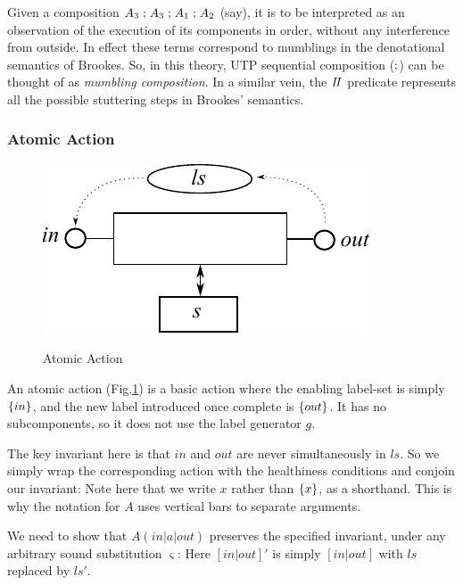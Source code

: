 Given a composition $A_3\mathrel{;} A_3\mathrel{;} A_1 \mathrel{;} A_2$ (say),
it is to be interpreted as an observation
of the execution of its components in order,
without any interference from outside.
In effect these terms correspond to mumblings in the denotational
semantics of Brookes\cite{DBLP:journals/iandc/Brookes96}.
So, in this theory,
UTP sequential composition ($\mathrel{;}$)
 can be thought of as \emph{mumbling composition}.
In a similar vein, the $I\!I$ predicate represents
all the possible stuttering steps in Brookes' semantics.


\newpage
\subsubsection{Atomic Action}

\begin{figure}
  \centering
  \includegraphics{images/atomic-action}\\
  \caption{Atomic Action}
  \label{fig:atomic-action}
\end{figure}

An atomic action (Fig.\ref{fig:atomic-action})
is a basic action where the enabling label-set is
simply $\{in\}$, and the new label introduced once complete
is $\{out\}$.
It has no subcomponents, so it does not use the label generator $g$.

The key invariant here is that $in$ and $out$ are never simultaneously in
$ls$. So we simply wrap the corresponding action with the healthiness
conditions and conjoin our invariant:
 Note here that we write $x$ rather than $\{x\}$, as a shorthand. This
is why the notation for $A$ uses vertical bars to separate arguments.

We need to show that $A(in|a|out)$ preserves the specified
invariant, under any arbitrary sound substitution $\varsigma$:
Here $[in|out]'$ is simply $[in|out]$ with $ls$ replaced by $ls'$.

